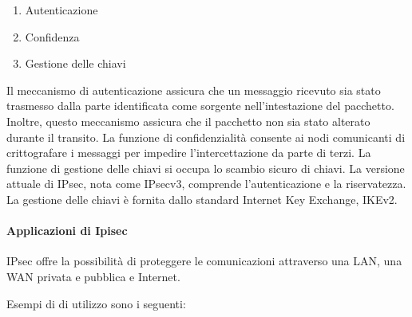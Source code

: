 \begin{enumerate}
    \item Autenticazione
    
    \item Confidenza 
    
    \item Gestione delle chiavi
\end{enumerate}
Il meccanismo di autenticazione assicura che un messaggio ricevuto sia stato trasmesso dalla parte identificata come sorgente nell'intestazione del pacchetto. Inoltre, questo meccanismo assicura che il pacchetto non sia stato alterato durante il transito. La funzione di confidenzialità consente ai nodi comunicanti di crittografare i messaggi per impedire l'intercettazione da parte di terzi. La funzione di gestione delle chiavi si occupa lo scambio sicuro di chiavi. La versione attuale di IPsec, nota come IPsecv3, comprende l'autenticazione e la riservatezza. La gestione delle chiavi è fornita dallo standard Internet Key Exchange, IKEv2.

\newpage
\paragraph{Applicazioni di Ipisec} IPsec offre la possibilità di proteggere le comunicazioni attraverso una LAN, una WAN privata e pubblica e Internet. 

\singlespacing

Esempi di di utilizzo sono i seguenti:

